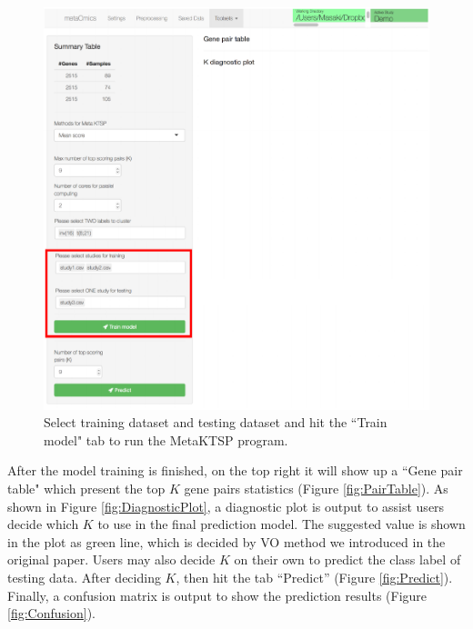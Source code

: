 \begin{figure}[H]
\begin{center}
\includegraphics[scale=0.7]{./figure/MetaKTSP/Figure8.pdf}
\caption{Select training dataset and testing dataset and hit the ``Train model" tab to run the MetaKTSP program.}
\label{fig:TrainTest}
\end{center}
\end{figure}

After the model training is finished, on the top right it will show up a ``Gene pair table" which present the top $K$ gene pairs statistics (Figure \ref{fig:PairTable}). As shown in Figure \ref{fig:DiagnosticPlot}, a diagnostic plot is output to assist users decide which $K$ to use in the final prediction model. The suggested value is shown in the plot as green line, which is decided by VO method we introduced in the original paper. Users may also decide $K$ on their own to predict the class label of testing data. After deciding $K$, then hit the tab ``Predict'' (Figure \ref{fig:Predict}). Finally, a confusion matrix is output to show the prediction results (Figure \ref{fig:Confusion}).

